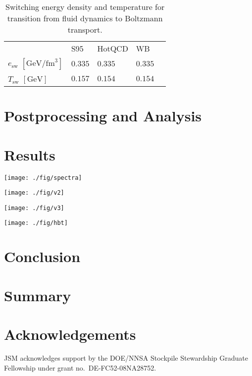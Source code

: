 \documentclass[aps,prc,reprint,amsmath,nofootinbib,superscriptaddress]{revtex4-1}
\begin{document}
\begin{table}
  \caption{
    \label{tab:tsw}
    Switching energy density and temperature for transition from fluid dynamics to Boltzmann transport.
  }
  \begin{ruledtabular}
  \begin{tabular}{lllll}
    & S95 & HotQCD & WB & \\
    \noalign{\smallskip}\hline\noalign{\smallskip}
    $e_\text{sw}$ $[\text{GeV}/\text{fm}^3]$ & $0.335$ & $0.335$ & $0.335$ &  \\
    $T_\text{sw}$ $[\text{GeV}]$ & $0.157$ & $0.154$ & $0.154$ & \\
  \end{tabular}
  \end{ruledtabular}
\end{table}


\section{Postprocessing and Analysis}

\section{Results}

\begin{figure*}[t]
  \texttt{[image: ./fig/spectra]}
  \caption{
    \label{fig:spectra}
  }
\end{figure*}

\begin{figure*}[t]
  \texttt{[image: ./fig/v2]}
  \caption{
    \label{fig:spectra}
  }
\end{figure*}

\begin{figure*}[t]
  \texttt{[image: ./fig/v3]}
  \caption{
    \label{fig:spectra}
  }
\end{figure*}

\begin{figure*}[t]
  \texttt{[image: ./fig/hbt]}
  \caption{
    \label{fig:spectra}
  }
\end{figure*}

\section{Conclusion}

\section{Summary}

\section{Acknowledgements}

\medskip
JSM acknowledges support by the DOE/NNSA Stockpile Stewardship Graduate Fellowship under grant no.~DE-FC52-08NA28752.


\end{document}
